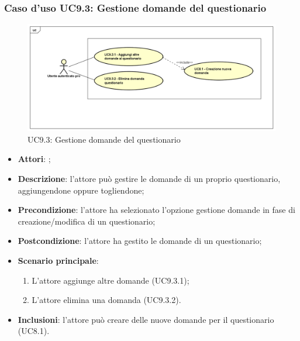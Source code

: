 	 \subsubsection{Caso d'uso UC9.3: Gestione domande del questionario}
	 \label{UC9.3}
	 \begin{figure}[h]
	 	\centering
	 	\includegraphics[scale=0.5,keepaspectratio]{UML/UC9_3.png}
	 	\caption{UC9.3: Gestione domande del questionario}
	 \end{figure}
	 \FloatBarrier
	 \begin{itemize}
	 	\item \textbf{Attori}: \uaupro{};
	 	\item \textbf{Descrizione}: l'attore può gestire le domande di un proprio questionario, aggiungendone oppure togliendone;
	 	\item \textbf{Precondizione}: l'attore ha selezionato l'opzione gestione domande in fase di creazione/modifica di un questionario;
	 	\item \textbf{Postcondizione}: l'attore ha gestito le domande di un questionario;
	 	\item \textbf{Scenario principale}: 
	 	\begin{enumerate}
	 		\item L'attore aggiunge altre domande (UC9.3.1);
	 		\item L'attore elimina una domanda (UC9.3.2).
	 	\end{enumerate}
	 	\item \textbf{Inclusioni}: l'attore può creare delle nuove domande per il questionario (UC8.1).		
	 \end{itemize}
	 
